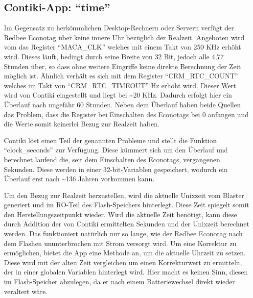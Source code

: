 \subsection{Contiki-App: "`time"'}

Im Gegensatz zu herkömmlichen Desktop-Rechnern oder Servern verfügt der Redbee Econotag über keine innere Uhr bezüglich der Realzeit.
Angeboten wird vom  das Register "`MACA\_CLK"' welches mit einem Takt von 250 KHz erhöht wird. Dieses läuft, bedingt durch
seine Breite von 32 Bit, jedoch alle 4,77 Stunden über, so dass ohne weitere Eingriffe keine direkte Berechnung der Zeit möglich ist.
Ähnlich verhält es sich mit dem Register "`CRM\_RTC\_COUNT"' welches im Takt von "`CRM\_RTC\_TIMEOUT"' Hz erhöht wird.
Dieser Wert wird von Contiki eingestellt und liegt bei \textasciitilde 20 KHz. Dadurch erfolgt hier ein Überlauf nach ungefähr 60 Stunden.
Neben dem Überlauf haben beide Quellen das Problem, dass die Register bei Einschalten des Econotags bei 0 anfangen und die Werte somit
keinerlei Bezug zur Realzeit haben.

Contiki löst einen Teil der genannten Probleme und stellt die Funktion "`clock\_seconds"' zur Verfügung. Diese kümmert sich um den Überlauf
und berechnet laufend die, seit dem Einschalten des Econotags, vergangenen Sekunden. Diese werden in einer 32-bit-Variablen gespeichert,
wodurch ein Überlauf erst nach \textasciitilde 136 Jahren vorkommen kann.

Um den Bezug zur Realzeit herzustellen, wird die aktuelle Unixzeit vom Blaster generiert und im RO-Teil des Flash-Speichers hinterlegt.
Diese Zeit spiegelt somit den Herstellungszeitpunkt wieder. Wird die aktuelle Zeit benötigt, kann diese durch Addition der von Contiki
ermittelten Sekunden und der Unixzeit berechnet werden. Das funktioniert natürlich nur so lange, wie der Redbee Econotag nach dem Flashen
ununterbrochen mit Strom versorgt wird. Um eine Korrektur zu ermöglichen, bietet die App eine Methode an, um die aktuelle Uhrzeit zu setzen.
Diese wird mit der alten Zeit vergleichen um einen Korrekturwert zu ermitteln, der in einer globalen Variablen hinterlegt wird. Hier macht es
keinen Sinn, diesen im Flash-Speicher abzulegen, da er nach einem Batteriewechsel direkt wieder veraltert wäre.